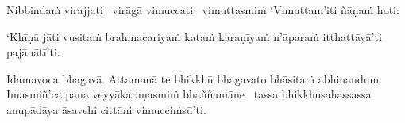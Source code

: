 \begin{pali-hang}
  Nibbindaṁ virajjati \breathmark\ virāgā vimuccati \breathmark\ vimuttasmiṁ `Vimuttam'iti ñāṇaṁ hoti:
\end{pali-hang}

\begin{pali-hang}
  `Khīṇā jāti vusitaṁ brahmacariyaṁ kataṁ karaṇīyaṁ n'āparaṁ itthattāyā'ti pajānātī'ti.
\end{pali-hang}

\begin{pali-hang}
  Idamavoca bhagavā. Attamanā te bhikkhū bhagavato bhāsitaṁ abhinanduṁ. Imasmiñ'ca pana veyyākaraṇasmiṁ bhaññamāne \breathmark\ tassa bhikkhusahassassa anupādāya āsavehi cittāni vimucciṁsū'ti.
\end{pali-hang}

\suttaRef{[SN 35.28]}

